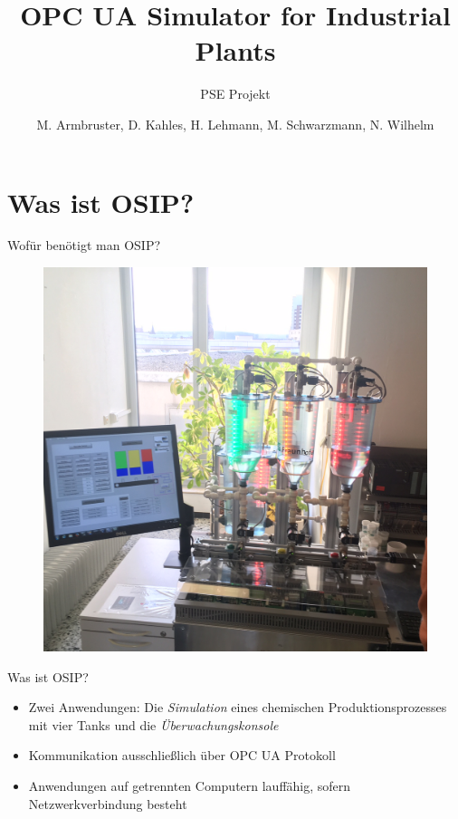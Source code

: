 \documentclass[22pt]{beamer}
\title[OSIP]{OPC UA Simulator for Industrial Plants}
\subtitle{PSE Projekt}
\author{M. Armbruster, D. Kahles, H. Lehmann, M. Schwarzmann, N. Wilhelm}
\begin{document}

\begin{frame}
\titlepage
\end{frame}

\section{Was ist OSIP?}
\begin{frame}{Wofür benötigt man OSIP?}
\begin{figure}[ht!]
\centering
\includegraphics[height=\textheight,width=\textwidth,keepaspectratio=true]{Demoanlage_IOSB.jpg}
\end{figure}
\end{frame}

\begin{frame}{Was ist OSIP?}
\begin{itemize}[<+->]
 \item Zwei Anwendungen: Die \emph{Simulation} eines chemischen Produktionsprozesses mit vier Tanks und die \emph{Überwachungskonsole}
 \item Kommunikation ausschließlich über OPC UA Protokoll
 \item Anwendungen auf getrennten Computern lauffähig, sofern Netzwerkverbindung besteht
\end{itemize}
\end{frame}
\end{document}
